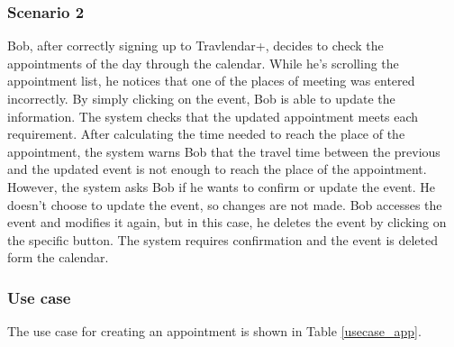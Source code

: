 \subsubsection{Scenario 2}
Bob, after correctly signing up to Travlendar+, decides to check the appointments of the day through the calendar. While he’s scrolling the appointment list, he notices that one of the places of meeting was entered incorrectly. By simply clicking on the event, Bob is able to update the information. The system checks that the updated appointment meets each requirement. After calculating the time needed to reach the place of the appointment, the system warns Bob that the travel time between the previous and the updated event is not enough to reach the place of the appointment. However, the system asks Bob if he wants to confirm or update the event. He doesn’t choose to update the event, so changes are not made. Bob accesses the event and modifies it again, but in this case, he deletes the event by clicking on the specific button. The system requires confirmation and the event is deleted form the calendar.

\subsubsection{Use case}
The use case for creating an appointment is shown in Table \ref{usecase_app}.

